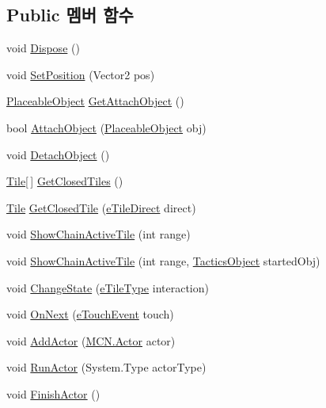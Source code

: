 \subsection*{Public 멤버 함수}
\begin{DoxyCompactItemize}
\item 
void \hyperlink{class_tile_a6e8a801e95a29156cbf32024e45c6596}{Dispose} ()
\item 
void \hyperlink{class_tile_a4d7a81b36513066aad741ed675164690}{Set\+Position} (Vector2 pos)
\item 
\hyperlink{class_placeable_object}{Placeable\+Object} \hyperlink{class_tile_a02150b69b975e8e9de1c3e10070a8dda}{Get\+Attach\+Object} ()
\item 
bool \hyperlink{class_tile_a1969ee41c320c6e7748a33374942e07e}{Attach\+Object} (\hyperlink{class_placeable_object}{Placeable\+Object} obj)
\item 
void \hyperlink{class_tile_ab8ab187ab674cfb222f761feac3b20b3}{Detach\+Object} ()
\item 
\hyperlink{class_tile}{Tile}\mbox{[}$\,$\mbox{]} \hyperlink{class_tile_a38b9f5c215f16448118e83e0d10aed05}{Get\+Closed\+Tiles} ()
\item 
\hyperlink{class_tile}{Tile} \hyperlink{class_tile_a838aaa6a94321629d04e944ed3bf8b9f}{Get\+Closed\+Tile} (\hyperlink{_tile_8cs_a082f743a62d2d8e13dac8fd38af246d7}{e\+Tile\+Direct} direct)
\item 
void \hyperlink{class_tile_a0ca6f4d1ddb0e7609749f1cf583b3c16}{Show\+Chain\+Active\+Tile} (int range)
\item 
void \hyperlink{class_tile_a6172e6a33d37d2992a1b0b6f5c2ed117}{Show\+Chain\+Active\+Tile} (int range, \hyperlink{class_tactics_object}{Tactics\+Object} started\+Obj)
\item 
void \hyperlink{class_tile_a2bb5c747e9483b803ea65b4341ce5af6}{Change\+State} (\hyperlink{_tile_8cs_a271bc07be325bca511bcb747e0ff2fda}{e\+Tile\+Type} interaction)
\item 
void \hyperlink{class_tile_a6133171796d47353aa5d57cd336e0a07}{On\+Next} (\hyperlink{_touch_manager_8cs_ae33e321a424fe84ba8b2fdb81ad40a68}{e\+Touch\+Event} touch)
\item 
void \hyperlink{class_tactics_object_a2c2b15e6cdb3639a2273978e9b9f294f}{Add\+Actor} (\hyperlink{class_m_c_n_1_1_actor}{M\+C\+N.\+Actor} actor)
\item 
void \hyperlink{class_tactics_object_ac24894e1e9355ac7bb7c94b7ea51ef02}{Run\+Actor} (System.\+Type actor\+Type)
\item 
void \hyperlink{class_tactics_object_a4e08c233c75e0f0025f13f92b4e3ec1a}{Finish\+Actor} ()

\end{DoxyCompactItemize}
